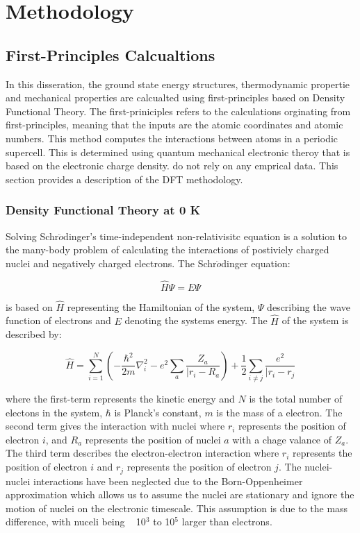 \chapter{Methodology}

\section{First-Principles Calcualtions}

In this disseration, the ground state energy structures, thermodynamic propertie and mechanical properties are calcualted using first-principles based on Density Functional Theory. The first-priniciples refers to the calculations orginating from first-principles, meaning that the inputs are the atomic coordinates and atomic numbers. This method computes the interactions between atoms in a periodic supercell. This is determined using quantum mechanical electronic theroy that is based on the electronic charge density. do not rely on any emprical data. This section provides a description of the DFT methodology.

\subsection{Density Functional Theory at 0 K}

Solving Schr$\ddot{o}$dinger's time-independent non-relativisitc equation is a solution to the many-body problem of calculating the interactions of postiviely charged nuclei and negatively charged electrons. The Schr$\ddot{o}$dinger equation:

\begin{equation}
\label{eq: schrodinger}
\hat{H} \Psi = E \Psi
\end{equation}

is based on $\hat{H}$ representing the Hamiltonian of the system, $\Psi$ describing the wave function of electrons and $E$ denoting the systems energy. The $\hat{H}$ of the system is described by:

\begin{equation}
\label{eq: hamiltonian}
\hat{H} = \sum_{i=1}^{N} (-\frac{\hbar^{2}}{2m} \nabla_{i}^{2} - e^{2} \sum_{a} \frac{Z_{a}}{|r_{i} - R_{a}}) + \frac{1}{2} \sum_{i \neq j} \frac{e^{2}}{|r_{i}-r_{j}}
\end{equation}

where the first-term represents the kinetic energy and $N$ is the total number of electons in the system, $\hbar$ is Planck's constant, $m$ is the mass of a electron. The second term gives the interaction with nuclei where $r_i$ represents the position of electron $i$, and $R_a$ represents the position of nuclei $a$ with a chage valance of $Z_a$. The third term describes the electron-electron interaction where $r_i$ represents the position of electron $i$ and $r_j$ represents the position of electron $j$. The nuclei-nuclei interactions have been neglected due to the Born-Oppenheimer approximation which allows us to assume the nuclei are stationary and ignore the motion of nuclei on the electronic timescale. This assumption is due to the mass difference, with nuceli being ~ 10$^3$ to 10$^5$ larger than electrons. 

